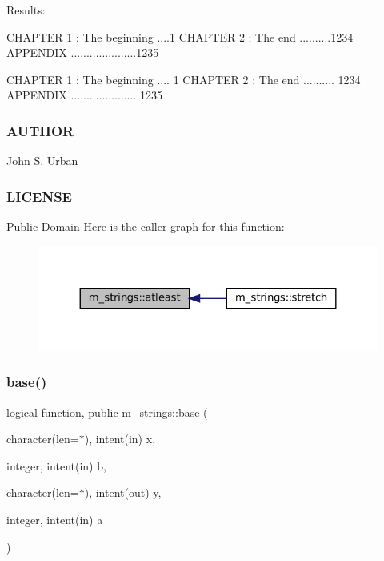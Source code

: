 Results\+: \begin{DoxyVerb}[abcdefghij]
[abcdefghij          ]

 CHAPTER 1 : The beginning ....1
 CHAPTER 2 : The end ..........1234
 APPENDIX .....................1235

 CHAPTER 1 : The beginning ....      1
 CHAPTER 2 : The end ..........   1234
 APPENDIX .....................   1235
\end{DoxyVerb}
 \subsubsection*{A\+U\+T\+H\+OR}

John S. Urban \subsubsection*{L\+I\+C\+E\+N\+SE}

Public Domain Here is the caller graph for this function\+:\nopagebreak
\begin{figure}[H]
\begin{center}
\leavevmode
\includegraphics[width=324pt]{namespacem__strings_ab20ba3a07833232eb3c67d4020a7fe64_icgraph}
\end{center}
\end{figure}
\mbox{\label{namespacem__strings_a635ef6f1dd73400e7b339392886d6357}} 
\subsubsection{\texorpdfstring{base()}{base()}}
{\footnotesize\ttfamily logical function, public m\+\_\+strings\+::base (\begin{DoxyParamCaption}\item[{character(len=$\ast$), intent(in)}]{x,  }\item[{integer, intent(in)}]{b,  }\item[{character(len=$\ast$), intent(out)}]{y,  }\item[{integer, intent(in)}]{a }\end{DoxyParamCaption})}



